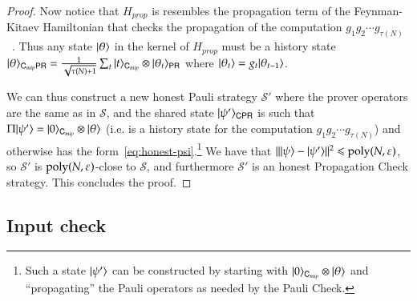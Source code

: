 \begin{proof}
	Now notice that $H_{prop}$ is resembles the propagation term of the Feynman-Kitaev Hamiltonian that checks the propagation of the computation $g_1 g_2 \cdots g_{\tau(N)}$~\cite{kitaev2002classical}. Thus any state $|\theta\rangle$ in the kernel of $H_{prop}$ must be a history state $|\theta\rangle_{{\mathsf{C}}_{mip} {\mathsf{P}} {\mathsf{R}}} = \frac{1}{\sqrt{\tau(N)+1}} \sum_t |t\rangle_{{\mathsf{C}}_{mip}} \otimes |\theta_t\rangle_{{\mathsf{P}} {\mathsf{R}}}$ where $|\theta_t\rangle = g_t |\theta_{t-1}\rangle$.
	
	We can thus construct a new honest Pauli strategy $\mathcal{S}'$ where the prover operators are the same as in $\mathcal{S}$, and the shared state $|\psi'\rangle_{{\mathsf{C}} {\mathsf{P}} {\mathsf{R}}}$ is such that $\Pi |\psi'\rangle = |0\rangle_{{\mathsf{C}}_{mip}} \otimes |\theta\rangle$ (i.e. is a history state for the computation $g_1 g_2 \cdots g_{\tau(N)}$) and otherwise has the form~\eqref{eq:honest-psi}.\footnote{Such a state $|\psi'\rangle$ can be constructed by starting with $|0\rangle_{{\mathsf{C}}_{mip}} \otimes |\theta\rangle$ and ``propagating'' the Pauli operators as needed by the Pauli Check.} We have that $\| |\psi\rangle - |\psi'\rangle \|^2 \leqslant \operatorname{poly}(N,\varepsilon)$, so $\mathcal{S}'$ is $\operatorname{poly}(N,\varepsilon)$-close to $\mathcal{S}$, and furthermore $\mathcal{S}'$ is an honest Propagation Check strategy. This concludes the proof. 
	
	
\end{proof}


\subsection{Input check}
\label{sec:input_check}


